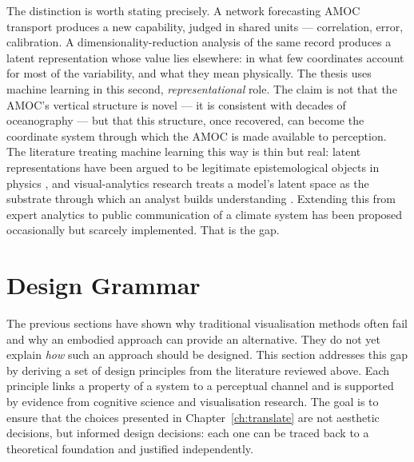The distinction is worth stating precisely. A network forecasting AMOC transport produces a new capability, judged in shared units --- correlation, error, calibration. A dimensionality-reduction analysis of the same record produces a latent representation whose value lies elsewhere: in what few coordinates account for most of the variability, and what they mean physically. The thesis uses machine learning in this second, \emph{representational} role. The claim is not that the AMOC's vertical structure is novel --- it is consistent with decades of oceanography \citep{hannachi2007, buckley2016} --- but that this structure, once recovered, can become the coordinate system through which the AMOC is made available to perception. The literature treating machine learning this way is thin but real: latent representations have been argued to be legitimate epistemological objects in physics \citep{iten2020}, and visual-analytics research treats a model's latent space as the substrate through which an analyst builds understanding \citep{sacha2018}. Extending this from expert analytics to public communication of a climate system has been proposed occasionally \citep{cabrera2023} but scarcely implemented. That is the gap.

\section{Design Grammar}
\label{sec:design-grammar}
 
The previous sections have shown why traditional visualisation methods often fail and why an embodied approach can provide an alternative. They do not yet explain \emph{how} such an approach should be designed. This section addresses this gap by deriving a set of design principles from the literature reviewed above. Each principle links a property of a system to a perceptual channel and is supported by evidence from cognitive science and visualisation research. The goal is to ensure that the choices presented in Chapter~\ref{ch:translate} are not aesthetic decisions, but informed design decisions: each one can be traced back to a theoretical foundation and justified independently.

